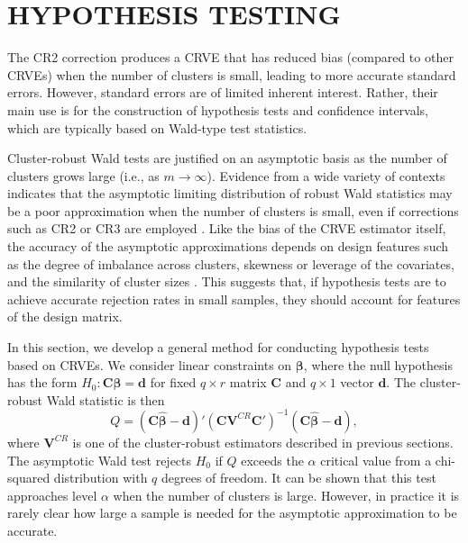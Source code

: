 \documentclass[12pt]{article}\usepackage[]{graphicx}\usepackage[]{color}
\newcommand{\bm}{\mathbf}
\newcommand{\bs}{\boldsymbol}
\begin{document}
\section{HYPOTHESIS TESTING}
\label{sec:testing}

The CR2 correction produces a CRVE that has reduced bias (compared to other CRVEs) when the number of clusters is small, leading to more accurate standard errors. However, standard errors are of limited inherent interest. Rather, their main use is for the construction of hypothesis tests and confidence intervals, which are typically based on Wald-type test statistics.

Cluster-robust Wald tests are justified on an asymptotic basis as the number of clusters grows large (i.e., as $m \to \infty$). 
Evidence from a wide variety of contexts indicates that the asymptotic limiting distribution of robust Wald statistics may be a poor approximation when the number of clusters is small, even if corrections such as CR2 or CR3 are employed \citep{Bell2002bias, Bertrand2004how, Cameron2008bootstrap}. 
Like the bias of the CRVE estimator itself, the accuracy of the asymptotic approximations depends on design features such as the degree of imbalance across clusters, skewness or leverage of the covariates, and the similarity of cluster sizes \citep[][]{McCaffrey2001generalizations, MacKinnon2016wild, Carter2013asymptotic}. 
This suggests that, if hypothesis tests are to achieve accurate rejection rates in small samples, they should account for features of the design matrix.

In this section, we develop a general method for conducting hypothesis tests based on CRVEs. We consider linear constraints on $\bs\beta$, where the null hypothesis has the form $H_0: \bm{C}\bs\beta = \bm{d}$ for fixed $q \times r$ matrix $\bm{C}$ and $q \times 1$ vector $\bm{d}$. 
The cluster-robust Wald statistic is then
\begin{equation}
\label{eq:Wald_stat}
Q = \left(\bm{C}\bs{\hat\beta} - \bm{d}\right)'\left(\bm{C} \bm{V}^{CR} \bm{C}'\right)^{-1}\left(\bm{C}\bs{\hat\beta} - \bm{d}\right),
\end{equation}
where $\bm{V}^{CR}$ is one of the cluster-robust estimators described in previous sections. 
The asymptotic Wald test rejects $H_0$ if $Q$ exceeds the $\alpha$ critical value from a chi-squared distribution with $q$ degrees of freedom. 
It can be shown that this test approaches level $\alpha$ when the number of clusters is large. 
However, in practice it is rarely clear how large a sample is needed for the asymptotic approximation to be accurate. 
\end{document}
